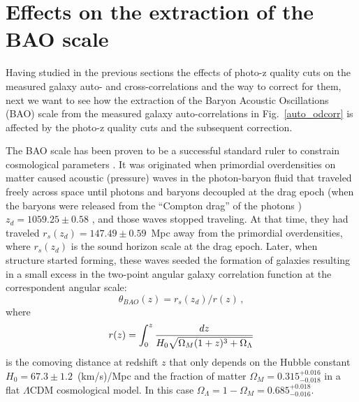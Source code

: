 \section{Effects on the extraction of the BAO scale}
\label{sec:BAO}
Having studied in the previous sections the effects of photo-z quality cuts on the measured galaxy auto- and cross-correlations and the way to correct for them, next we want to see how the extraction of the Baryon Acoustic Oscillations (BAO) scale from the measured galaxy auto-correlations in Fig.~\ref{auto_odcorr} is affected by the 
photo-z quality cuts and the subsequent correction. 

The BAO scale has been proven to be a successful standard ruler to constrain cosmological parameters \citep{Eisenstein2005, Hutsi2006, Percival2007, Padmanabhan2007, Okumura2008, Gaztanaga2009}. It was originated when primordial overdensities on matter caused acoustic (pressure) waves in the photon-baryon fluid that traveled freely across space until photons and baryons decoupled at the drag epoch (when the baryons were released from the ``Compton drag'' of the photons \citep{Hu1996}) $z_d=1059.25\pm0.58$ \citep{Ade2013}, and those waves stopped traveling. At that time, they had traveled $r_s(z_d)=147.49\pm0.59$~Mpc \citep{Ade2013} away from the primordial overdensities, where $r_s(z_d)$ is the sound horizon scale at the drag epoch. Later, when structure started forming, these waves seeded the formation of galaxies resulting in a small excess in the two-point angular galaxy correlation function at the correspondent angular scale: 
\begin{equation}
\theta_{BAO}(z) = r_s (z_d)/ r(z) \, ,
\label{bao_scale}
\end{equation}
where
\begin{equation}
r(z) = \int^z_0 {dz \over H_0\sqrt{\Omega_M(1+z)^3+\Omega_\Lambda}}
\label{comov_dist}
\end{equation}
is the comoving distance at redshift $z$ that only depends on the Hubble constant $H_0=67.3\pm1.2$~(km/s)/Mpc and the fraction of matter $\Omega_M=0.315^{+0.016}_{-0.018}$ \citep{Ade2013} in a flat $\Lambda$CDM cosmological model. In this case $\Omega_\Lambda = 1 - \Omega_M =0.685^{+0.018}_{-0.016}$. 

